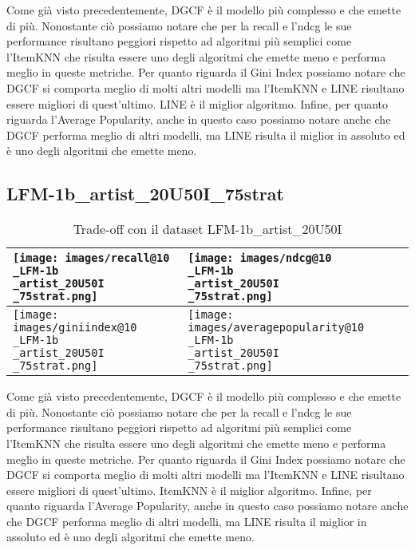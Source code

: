 \noindent Come già visto precedentemente, DGCF è il modello più complesso e che emette di più. Nonostante ciò possiamo notare che per la recall e l'ndcg le sue performance risultano peggiori rispetto ad algoritmi più semplici come l'ItemKNN che risulta essere uno degli algoritmi che emette meno e performa meglio in queste metriche.
Per quanto riguarda il Gini Index possiamo notare che DGCF si comporta meglio di molti altri modelli ma l'ItemKNN e LINE risultano essere migliori di quest'ultimo. LINE è il miglior algoritmo.
Infine, per quanto riguarda l'Average Popularity, anche in questo caso possiamo notare anche che DGCF performa meglio di altri modelli, ma LINE risulta il miglior in assoluto ed è uno degli algoritmi che emette meno.


\subsection{LFM-1b\_artist\_20U50I\_75strat}


\begin{table}[H]
    \centering
    \footnotesize
    \setlength\tabcolsep{0pt}
    \begin{tabularx}{\textwidth}{|X|X|}
        \hline
        \texttt{[image: images/recall@10\\\_LFM-1b\\\_artist\_20U50I\\\_75strat.png]} &
        \texttt{[image: images/ndcg@10\\\_LFM-1b\\\_artist\_20U50I\\\_75strat.png]} \\
        \hline
        \texttt{[image: images/giniindex@10\\\_LFM-1b\\\_artist\_20U50I\\\_75strat.png]} &
        \texttt{[image: images/averagepopularity@10\\\_LFM-1b\\\_artist\_20U50I\\\_75strat.png]} \\
        \hline
    \end{tabularx}
    \caption{Trade-off con il dataset LFM-1b\_artist\_20U50I}
    \label{tab:emissions_info}
\end{table}


\noindent Come già visto precedentemente, DGCF è il modello più complesso e che emette di più. Nonostante ciò possiamo notare che per la recall e l'ndcg le sue performance risultano peggiori rispetto ad algoritmi più semplici come l'ItemKNN che risulta essere uno degli algoritmi che emette meno e performa meglio in queste metriche.
Per quanto riguarda il Gini Index possiamo notare che DGCF si comporta meglio di molti altri modelli ma l'ItemKNN e LINE risultano essere migliori di quest'ultimo. ItemKNN è il miglior algoritmo.
Infine, per quanto riguarda l'Average Popularity, anche in questo caso possiamo notare anche che DGCF performa meglio di altri modelli, ma LINE risulta il miglior in assoluto ed è uno degli algoritmi che emette meno.





